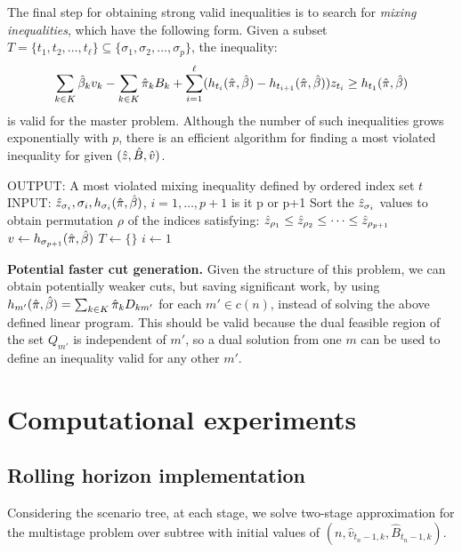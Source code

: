 \documentclass[10pt]{article}
\newcommand{\ti}{t} %
\newcommand{\ka}{k} %
\newcommand{\KA}{K}
\newcommand{\Bi}{B} %
\newcommand{\Vi}{v} %
\newcommand{\Zed}{z} %
\newcommand{\cred}{\color{red!65!black}}
\begin{document}
The final step for obtaining strong valid inequalities is to search for {\it mixing inequalities}, which have the following form. Given a subset $T = \{t_1,t_2,\ldots,t_{\ell}\} \subseteq \{\sigma_1,\sigma_2,\ldots,\sigma_p\}$, the inequality:
\[  \sum_{\ka  \in \KA} \betasol_k \Vi_k - \sum_{\ka  \in \KA} \pisol_k \Bi_k + 
\sum_{i=1}^{\ell} (h_{t_i}(\pisol,\betasol) - h_{t_{i+1}}(\pisol,\betasol))\Zed_{t_i}
\geq  h_{t_1}(\pisol,\betasol) \]
is valid for the master problem. Although the number of such inequalities grows exponentially with $p$, there is an efficient algorithm for finding a most violated inequality for given $(\zsol,\bsol,\vsol)$. 

\begin{algorithm}[H]
\SetAlgoLined
{OUTPUT: A most violated mixing inequality defined by ordered index set $\ti$ } \;
INPUT: $\zsol_{\sigma_i}, \sigma_i, h_{\sigma_i}(\pisol,\betasol)$, $i=1,\ldots,p+1$  {\cred is it p or p+1}\;
Sort the $\zsol_{\sigma_i}$ values to obtain permutation $\rho$ of the indices satisfying:
$\zsol_{\rho_1} \leq \zsol_{\rho_2} \leq \cdots \leq \zsol_{\rho_{p+1}} $ \;
$v \gets h_{\sigma_{p+1}}(\hat{\pi},\hat{\beta})$\;
$T \gets \{ \}$\;
$ i \gets 1$\;

\end{algorithm}

{\bf Potential faster cut generation.} Given the structure of this problem,  we can obtain potentially weaker cuts, but saving significant work, by using $h_{m'}(\pisol,\betasol) = \sum_{\ka  \in \KA} \pisol_k D_{km'}$ for each $m' \in c(n)$, instead of solving the above defined linear program. This should be valid because the dual feasible region of the set $Q_{m'}$ is independent of $m'$, so a dual solution from one $m$ can be used to define an inequality valid for any other $m'$.



  

\section{Computational experiments}
\subsection{Rolling horizon implementation}

Considering the scenario tree,  at each stage, we solve two-stage approximation for the multistage problem over
subtree with initial values of $(n,\hat{\Vi}_{\ti_n-1 , \ka},\hat{\Bi}_{\ti_n-1 , \ka})$.
\end{document}
